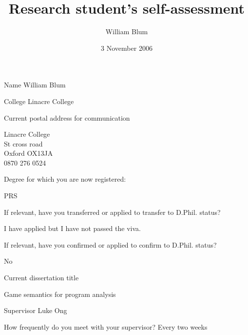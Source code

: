 \documentclass{article}
\author{William Blum}
\title{Research student's self-assessment}
\date{3 November 2006}
\def\answ#1{#1 \vspace{0.5em}}
\newcounter{SQcount}
\newenvironment{subq}{
\begin{list}
    {} %
    {   \usecounter{SQcount}
        \renewcommand{\makelabel}[1]{\stepcounter{SQcount} \textbf{\alph{SQcount}) \parbox[t]{0.8\linewidth}{{##1}}}  }
        \setlength{\rightmargin}{\leftmargin}
    }
}
{\end{list}}
\begin{document}
\maketitle

\begin{list}
    {} %
    {   
        \renewcommand{\makelabel}[1]{\stepcounter{Lcount} \textbf{\arabic{Lcount} {{#1\hfil}}:}  }
        \setlength{\leftmargin}{0pt}
        \setlength{\rightmargin}{\leftmargin}
    }

\item[Name] \answ{William Blum}

\item[College] \answ{Linacre College}

\item[Current postal address for communication]

\parbox[t]{3cm}{
\answ{Linacre College\\
St cross road\\
Oxford OX13JA \\
0870 276 0524}}

\item[]
\begin{subq}
\item[Degree for which you are now registered:] \

   \answ{\indent PRS}

\item[If relevant, have you transferred or applied to
transfer to D.Phil. status?] \

   \answ{I have applied but I have not passed the viva.}

\item[If relevant, have you confirmed or applied to
confirm to D.Phil. status?] \

   \answ{No}

\end{subq}



\item[Current dissertation title]

\answ{Game semantics for program analysis}

\item[Supervisor] \answ{Luke Ong}

\item[How frequently do you meet with your supervisor?]
Every two weeks


\end{list}
\end{document}
